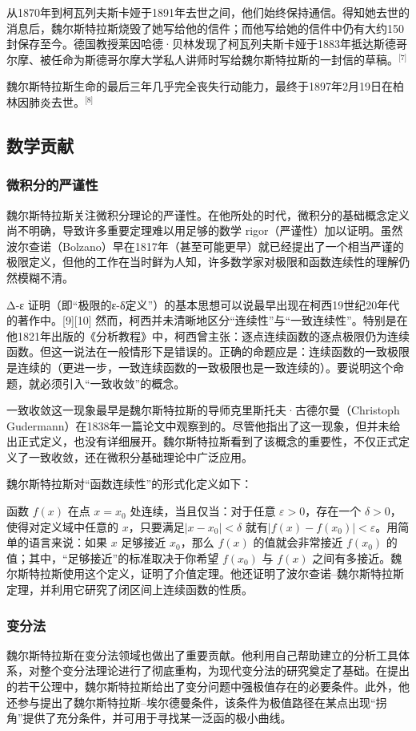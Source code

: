 从1870年到柯瓦列夫斯卡娅于1891年去世之间，他们始终保持通信。得知她去世的消息后，魏尔斯特拉斯烧毁了她写给他的信件；而他写给她的信件中仍有大约150封保存至今。德国教授莱因哈德·贝林发现了柯瓦列夫斯卡娅于1883年抵达斯德哥尔摩、被任命为斯德哥尔摩大学私人讲师时写给魏尔斯特拉斯的一封信的草稿。\(^\text{[7]}\)

魏尔斯特拉斯生命的最后三年几乎完全丧失行动能力，最终于1897年2月19日在柏林因肺炎去世。\(^\text{[8]}\)
\subsection{数学贡献}
\subsubsection{微积分的严谨性}
魏尔斯特拉斯关注微积分理论的严谨性。在他所处的时代，微积分的基础概念定义尚不明确，导致许多重要定理难以用足够的数学 rigor（严谨性）加以证明。虽然波尔查诺（Bolzano）早在1817年（甚至可能更早）就已经提出了一个相当严谨的极限定义，但他的工作在当时鲜为人知，许多数学家对极限和函数连续性的理解仍然模糊不清。

Δ-ε 证明（即“极限的ε-δ定义”）的基本思想可以说最早出现在柯西19世纪20年代的著作中。[9][10] 然而，柯西并未清晰地区分“连续性”与“一致连续性”。特别是在他1821年出版的《分析教程》中，柯西曾主张：逐点连续函数的逐点极限仍为连续函数。但这一说法在一般情形下是错误的。正确的命题应是：连续函数的一致极限是连续的（更进一步，一致连续函数的一致极限也是一致连续的）。要说明这个命题，就必须引入“一致收敛”的概念。

一致收敛这一现象最早是魏尔斯特拉斯的导师克里斯托夫·古德尔曼（Christoph Gudermann）在1838年一篇论文中观察到的。尽管他指出了这一现象，但并未给出正式定义，也没有详细展开。魏尔斯特拉斯看到了该概念的重要性，不仅正式定义了一致收敛，还在微积分基础理论中广泛应用。

魏尔斯特拉斯对“函数连续性”的形式化定义如下：

函数 $f(x)$ 在点 $x = x_0$ 处连续，当且仅当：对于任意 $\varepsilon > 0$，存在一个 $\delta > 0$，使得对定义域中任意的 $x$，只要满足$|x - x_0| < \delta$
就有$|f(x) - f(x_0)| < \varepsilon$。用简单的语言来说：如果 $x$ 足够接近 $x_0$，那么 $f(x)$ 的值就会非常接近 $f(x_0)$ 的值；其中，“足够接近”的标准取决于你希望 $f(x_0)$ 与 $f(x)$ 之间有多接近。魏尔斯特拉斯使用这个定义，证明了介值定理。他还证明了波尔查诺–魏尔斯特拉斯定理，并利用它研究了闭区间上连续函数的性质。
\subsubsection{变分法}
魏尔斯特拉斯在变分法领域也做出了重要贡献。他利用自己帮助建立的分析工具体系，对整个变分法理论进行了彻底重构，为现代变分法的研究奠定了基础。在提出的若干公理中，魏尔斯特拉斯给出了变分问题中强极值存在的必要条件。此外，他还参与提出了魏尔斯特拉斯–埃尔德曼条件，该条件为极值路径在某点出现“拐角”提供了充分条件，并可用于寻找某一泛函的极小曲线。
